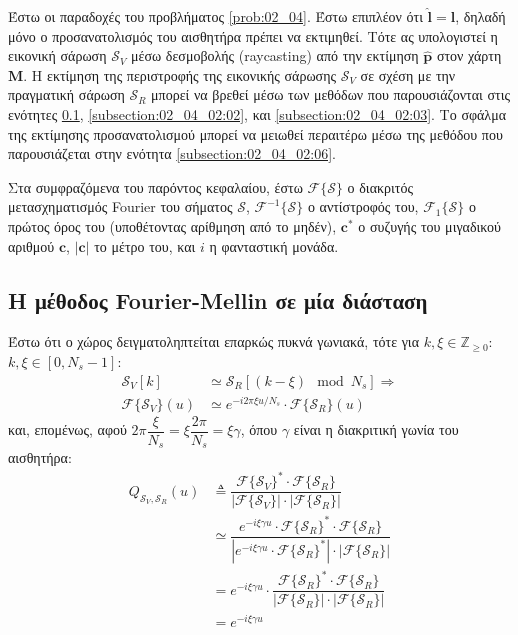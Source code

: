 Έστω οι παραδοχές του προβλήματος \ref{prob:02_04}. Έστω επιπλέον ότι
$\hat{\bm{l}} = \bm{l}$, δηλαδή μόνο ο προσανατολισμός του αισθητήρα πρέπει να
εκτιμηθεί. Τότε ας υπολογιστεί η εικονική σάρωση $\mathcal{S}_V$ μέσω
δεσμοβολής (raycasting) από την εκτίμηση $\hat{\bm{p}}$ στον χάρτη $\bm{M}$. Η
εκτίμηση της περιστροφής της εικονικής σάρωσης $\mathcal{S}_V$ σε σχέση με την
πραγματική σάρωση $\mathcal{S}_R$ μπορεί να βρεθεί μέσω των μεθόδων που
παρουσιάζονται στις ενότητες \ref{subsection:02_04_02:01},
\ref{subsection:02_04_02:02}, και \ref{subsection:02_04_02:03}. Το σφάλμα της
εκτίμησης προσανατολισμού μπορεί να μειωθεί περαιτέρω μέσω της μεθόδου που
παρουσιάζεται στην ενότητα \ref{subsection:02_04_02:06}.

Στα συμφραζόμενα του παρόντος κεφαλαίου, έστω $\mathcal{F}\{\mathcal{S}\}$ ο
διακριτός μετασχηματισμός Fourier του σήματος $\mathcal{S}$,
$\mathcal{F}^{-1}\{\mathcal{S}\}$ ο αντίστροφός του,
$\mathcal{F}_1\{\mathcal{S}\}$ ο πρώτος όρος του (υποθέτοντας αρίθμηση από το
μηδέν), $\bm{c}^\ast$ ο συζυγής του μιγαδικού αριθμού $\bm{c}$, $|\bm{c}|$ το
μέτρο του, και $i$ η φανταστική μονάδα.

\subsection{Η μέθοδος Fourier-Mellin σε μία διάσταση}
\label{subsection:02_04_02:01}

Έστω ότι ο χώρος δειγματοληπτείται επαρκώς πυκνά γωνιακά, τότε για
$k,\xi \in \mathbb{Z}_{\geq 0}$: $k,\xi \in [0, N_s-1]$:
\begin{align}
  \mathcal{S}_V[k] &\simeq \mathcal{S}_R[(k - \xi) \mod N_s] \Rightarrow \nonumber \\
  \mathcal{F}\{\mathcal{S}_V\}(u) &\simeq e^{-i 2\pi \xi u / N_s} \cdot \mathcal{F}\{\mathcal{S}_R\}(u) \nonumber
\end{align}
και, επομένως, αφού $2\pi \dfrac{\xi}{N_s} = \xi \dfrac{2\pi}{N_s} = \xi \gamma$,
όπου $\gamma$ είναι η διακριτική γωνία του αισθητήρα:
\begin{align}
  Q_{\mathcal{S}_V, \mathcal{S}_R}(u) & \triangleq \dfrac{\mathcal{F}\{\mathcal{S}_V\}^{\ast} \cdot \mathcal{F}\{\mathcal{S}_R\}}{|\mathcal{F}\{\mathcal{S}_V\}| \cdot |\mathcal{F}\{\mathcal{S}_R\}|} \nonumber \\
  &\simeq \dfrac{e^{-i \xi \gamma u} \cdot \mathcal{F}\{\mathcal{S}_R\}^\ast \cdot \mathcal{F}\{\mathcal{S}_R\}}{|e^{- i \xi \gamma u} \cdot \mathcal{F}\{\mathcal{S}_R\}^\ast | \cdot | \mathcal{F}\{\mathcal{S}_R\}|} \nonumber \\
  &= e^{-i \xi \gamma u} \cdot \dfrac{\mathcal{F}\{\mathcal{S}_R\}^\ast \cdot \mathcal{F}\{\mathcal{S}_R\}}{|\mathcal{F}\{\mathcal{S}_R\} | \cdot | \mathcal{F}\{\mathcal{S}_R\}|} \nonumber \\
  &= e^{-i \xi \gamma u}
  \label{eq:Q0}
\end{align}

